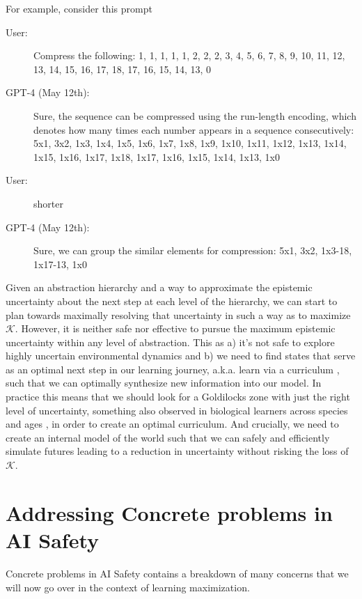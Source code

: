 \documentclass{article}
\begin{document}
For example, consider this prompt


\begin{description}
    \item[User:] Compress the following: 1, 1, 1, 1, 1, 2, 2, 2, 3, 4, 5, 6, 7, 8, 9, 10, 11, 12, 13, 14, 15, 16, 17, 18, 17, 16, 15, 14, 13, 0
    \item[GPT-4 (May 12th):] Sure, the sequence can be compressed using the run-length encoding, which denotes how many times each number appears in a sequence consecutively:
    5x1, 3x2, 1x3, 1x4, 1x5, 1x6, 1x7, 1x8, 1x9, 1x10, 1x11, 1x12, 1x13, 1x14, 1x15, 1x16, 1x17, 1x18, 1x17, 1x16, 1x15, 1x14, 1x13, 1x0
    \item[User:] shorter
    \item[GPT-4 (May 12th):] Sure, we can group the similar elements for compression: 5x1, 3x2, 1x3-18, 1x17-13, 1x0
\end{description}

Given an abstraction hierarchy and a way to approximate the epistemic uncertainty about the next step at each level of the hierarchy, we can start to plan towards maximally resolving that uncertainty in such a way as to maximize $\mathcal{K}$. However, it is neither safe nor effective to pursue the maximum epistemic uncertainty within any level of abstraction. This as a) it's not safe to explore highly uncertain environmental dynamics\cite{plappert2018multi} and b) we need to find states that serve as an optimal next step in our learning journey, a.k.a. learn via a curriculum \cite{bengio2009curriculum}, such that we can optimally synthesize new information into our model. In practice this means that we should look for a Goldilocks zone with just the right level of uncertainty, something also observed in biological learners across species and ages \cite{kidd2012goldilocks}, in order to create an optimal curriculum. And crucially, we need to create an internal model \cite{jang2023reflection} of the world such that we can safely and efficiently simulate futures leading to a reduction in uncertainty without risking the loss of $\mathcal{K}$.

\newpage

\section{Addressing Concrete problems in AI Safety}

Concrete problems in AI Safety \cite{amodei2016concrete} contains a breakdown of many concerns that we will now go over in the context of learning maximization.
\end{document}
